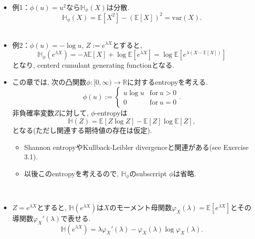 \documentclass[aspectratio=169, dvipdfmx]{beamer}
\newcommand{\ex}{\mathbb{E}}
\newcommand{\var}{\mathrm{var}}
\begin{document}
\begin{frame}
\begin{itemize}
    \item 例1：$\phi(u) = u^2$なら$\mathbb{H}_\phi(X)$は分散.
        \[ \mathbb{H}_\phi(X) = \ex[X^2] - (\ex[X])^2 = \var(X).\]
    　
    \item 例2：$\phi(u) = -\log u$, $Z := e^{\lambda X}$とすると,
        \[ \mathbb{H}_\phi(e^{\lambda X})  = -\lambda \ex[X] + \log \ex[e^{\lambda X}] = \log\ex[e^{\lambda(X-\ex[X])}]\]
        となり, centerd cumulant generating functionとなる.
\end{itemize}
\end{frame}

\begin{frame}
    \begin{itemize}
        \item この章では, 次の凸関数$\phi:[0,\infty)\to\mathbb{R}$に対するentropyを考える.
        \[\phi(u) := 
            \begin{cases}
                u\log u & \mathrm{for} \ u > 0\\
                0       & \mathrm{for} \ u = 0
            \end{cases}.\tag{3.1}\label{3.1}
        \]
        非負確率変数$Z$に対して, $\phi$-entropyは
        \[ \mathbb{H}(Z) = \ex[Z\log Z] - \ex[Z]\log\ex[Z], \tag{3.2}\label{3.2}\]
        となる(ただし関連する期待値の存在は仮定). 
        \begin{itemize}
            \item Shannon entropyやKullback-Leibler divergenceと関連がある(see Exercise 3.1).
            \item 以後このentropyを考えるので, $\mathbb{H}_\phi$のsubscrript $\phi$は省略.
        \end{itemize}
        　
        \item $Z = e^{\lambda X}$とすると, $\mathbb{H}(e^{\lambda X})$は$X$のモーメント母関数$\varphi_X(\lambda)=\ex[e^{\lambda X}]$とその導関数$\varphi_X'(\lambda)$で表せる.
        \[\mathbb{H}(e^{\lambda X}) = \lambda \varphi_X'(\lambda) - \varphi_X(\lambda)\log\varphi_X(\lambda). \tag{3.3}\label{3.3}\]
    \end{itemize}
\end{frame}
\end{document}
